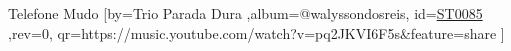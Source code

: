 \beginsong
{Telefone Mudo %
}[by={Trio Parada Dura %
},album={@walyssondosreis},
id={\href{https://music.youtube.com/watch?v=pq2JKVI6F5s&feature=share %
}{ST0085 %
}},rev={0}, %
qr={https://music.youtube.com/watch?v=pq2JKVI6F5s&feature=share %
}]
\beginverse
